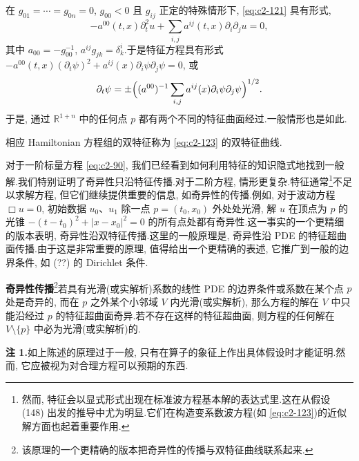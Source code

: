 \begin{remark*}
在 $g_{01} = \cdots = g_{0n} = 0$, $g_{00} < 0$ 且 $g_{ij}$ 正定的特殊情形下, \eqref{eq:c2-121} 具有形式,
\begin{equation}
-a^{00}(t, x) \partial_{t}^{2} u + \sum_{i, j} a^{ij}(t, x) \partial_{i} \partial_{j} u = 0, \label{eq:c2-123}
\end{equation}
其中 $a_{00} = -g_{00}^{-1}$, $a^{ij} g_{jk} = \delta_{k}^{i}$.于是特征方程具有形式 $-a^{00}(t, x) (\partial_{t} \psi)^{2} + a^{ij}(x) \partial_{i} \psi \partial_{j} \psi = 0$, 或
\begin{equation}
\partial_{t} \psi = \pm \Bigl((a^{00})^{-1} \sum_{i, j} a^{ij}(x) \partial_{i} \psi \partial_{j} \psi\Bigr)^{1/2}. \label{eq:c2-124}
\end{equation}
于是, 通过 $\mathbb{R}^{1+n}$ 中的任何点 $p$ 都有两个不同的特征曲面经过.一般情形也是如此.
\end{remark*}

相应 Hamiltonian 方程组的双特征称为 \eqref{eq:c2-123} 的双特征曲线.

\begin{remark*}
对于一阶标量方程 \eqref{eq:c2-90}, 我们已经看到如何利用特征的知识隐式地找到一般解.我们特别证明了奇异性只沿特征传播.对于二阶方程, 情形更复杂.特征通常\footnote{然而, 特征会以显式形式出现在标准波方程基本解的表达式里.这在从假设 (148) 出发的推导中尤为明显.它们在构造变系数波方程(如 \eqref{eq:c2-123})的近似解方面也起着重要作用.}不足以求解方程, 但它们继续提供重要的信息, 如奇异性的传播.例如, 对于波动方程 $\Box u = 0$, 初始数据 $u_{0}$、$u_{1}$ 除一点 $p = (t_{0}, x_{0})$ 外处处光滑, 解 $u$ 在顶点为 $p$ 的光锥 $-(t - t_{0})^{2} + |x - x_{0}|^{2} = 0$ 的所有点处都有奇异性.这一事实的一个更精细的版本表明, 奇异性沿双特征传播.这里的一般原理是, 奇异性沿 PDE 的特征超曲面传播.由于这是非常重要的原理, 值得给出一个更精确的表述, 它推广到一般的边界条件, 如 (??) 的 Dirichlet 条件.
\end{remark*}

\noindent\textbf{奇异性传播}\footnote{该原理的一个更精确的版本把奇异性的传播与双特征曲线联系起来.}\quad 若具有光滑(或实解析)系数的线性 PDE 的边界条件或系数在某个点 $p$ 处是奇异的, 而在 $p$ 之外某个小邻域 $V$ 内光滑(或实解析), 那么方程的解在 $V$ 中只能沿经过 $p$ 的特征超曲面奇异.若不存在这样的特征超曲面, 则方程的任何解在 $V \setminus \{p\}$ 中必为光滑(或实解析)的.

\noindent\textbf{注 1.}\quad 如上陈述的原理过于一般, 只有在算子的象征上作出具体假设时才能证明.然而, 它应被视为对合理方程可以预期的东西.


